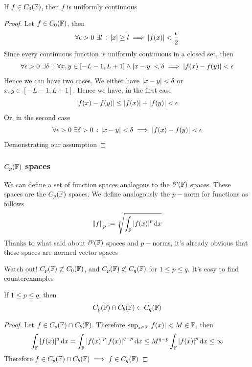 \documentclass[../complete.tex]{subfiles}
\begin{document}
\begin{prop}
	If $f\in C_0(\mathbb{F})$, then $f$ is uniformly continuous
\end{prop}
\begin{proof}
	Let $f\in C_0(\mathbb{F})$, then
	\begin{equation*}
		\forall\epsilon>0\ \exists l\, :\,  \abs{x}\ge l\implies{}\abs{f(x)}<\frac{\epsilon}{2}
	\end{equation*}
	Since every continuous function is uniformly continuous in a closed set, then
	\begin{equation*}
		\forall\epsilon>0\ \exists\delta\st\forall x,y\in[-L-1,L+1]\wedge\abs{x-y}<\delta\implies{}\abs{f(x)-f(y)}<\epsilon
	\end{equation*}
	Hence we can have two cases. We either have $\abs{x-y}<\delta$ or $x,y\in[-L-1,L+1]$. Hence we have, in the first case
	\begin{equation*}
		\abs{f(x)-f(y)}\le\abs{f(x)}+\abs{f(y)}<\epsilon
	\end{equation*}
	Or, in the second case
	\begin{equation*}
		\forall\epsilon>0\ \exists\delta>0\st\abs{x-y}<\delta\implies{}\abs{f(x)-f(y)}<\epsilon
	\end{equation*}
	Demonstrating our assumption
\end{proof}
\subsubsection{$C_p(\mathbb{F})$ spaces}
\begin{dfn}
	We can define a set of function spaces analogous to the $\ell^p(\mathbb{F})$ spaces. These spaces are the $C_p(\mathbb{F})$ spaces. We define analogously the $p-$norm for functions as follows
	\begin{equation}
		\norm{f}_{p}:=\sqrt[p]{\int_{\mathbb{F}}\abs{f(x)}^p\operatorname{d\!}{x}}
		\label{eq:funpnorm}
	\end{equation}
	Thanks to what said about $\ell^p(\mathbb{F})$ spaces and $p-$norms, it's already obvious that these spaces are normed vector spaces
\end{dfn}
\begin{rmk}
	Watch out! $C_p(\mathbb{F})\not\subset C_0(\mathbb{F})$, and $C_p(\mathbb{F})\not\subset C_q(\mathbb{F})$ for $1\le p\le q$. It's easy to find counterexamples
\end{rmk}
\begin{prop}
	If $1\le p\le q$, then
	\begin{equation*}
		C_p(\mathbb{F})\cap C_b(\mathbb{F})\subset C_q(\mathbb{F})
	\end{equation*}
\end{prop}
\begin{proof}
	Let $f\in C_p(\mathbb{F})\cap C_b(\mathbb{F})$. Therefore $\sup_{x\in\mathbb{F}}\abs{f(x)}<M\in\mathbb{F}$, then
	\begin{equation*}
		\int_{\mathbb{F}}\abs{f(x)}^q\operatorname{d\!}{x}=\int_{\mathbb{F}}^{}\abs{f(x)}^p\abs{f(x)}^{q-p}\operatorname{d\!}{x}\le M^{q-p}\int_{\mathbb{F}}\abs{f(x)}^p\operatorname{d\!}{x}\le\infty
	\end{equation*}
	Therefore $f\in C_p(\mathbb{F})\cap C_b(\mathbb{F})\implies{} f\in C_q(\mathbb{F})$
\end{proof}
\end{document}
